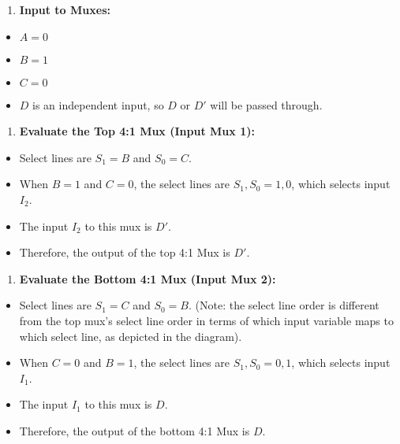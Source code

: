 \documentclass{article}
\begin{document}
\begin{enumerate}
\item \textbf{Input to Muxes:}

\end{enumerate}
    \begin{itemize}
        \item $A = 0$
        \item $B = 1$
        \item $C = 0$
        \item $D$ is an independent input, so $D$ or $D'$ will be passed through.
    \end{itemize}

\begin{enumerate}
\item \textbf{Evaluate the Top 4:1 Mux (Input Mux 1):}

\end{enumerate}
    \begin{itemize}
        \item Select lines are $S_1=B$ and $S_0=C$.
        \item When $B=1$ and $C=0$, the select lines are ${S_1, S_0} = {1,0}$, which selects input $I_2$.
        \item The input $I_2$ to this mux is $D'$.
        \item Therefore, the output of the top 4:1 Mux is $D'$.
    \end{itemize}

\begin{enumerate}
\item \textbf{Evaluate the Bottom 4:1 Mux (Input Mux 2):}

\end{enumerate}
    \begin{itemize}
        \item Select lines are $S_1=C$ and $S_0=B$. (Note: the select line order is different from the top mux's select line order in terms of which input variable maps to which select line, as depicted in the diagram).
        \item When $C=0$ and $B=1$, the select lines are ${S_1, S_0} = {0,1}$, which selects input $I_1$.
        \item The input $I_1$ to this mux is $D$.
        \item Therefore, the output of the bottom 4:1 Mux is $D$.
    \end{itemize}
\end{document}
